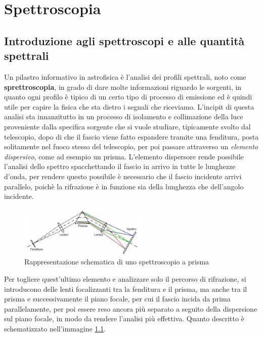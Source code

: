 \chapter{Spettroscopia}

\section{Introduzione agli spettroscopi e alle quantità spettrali}

Un pilastro informativo in astrofisica è l'analisi dei profili spettrali, noto come \textbf{sprettroscopia}, in grado di dare molte informazioni riguardo le sorgenti, in quanto ogni profilo è tipico di un certo tipo di processo di emissione ed è quindi utile per capire la fisica che sta dietro i segnali che riceviamo. L'incipit di questa analisi sta innanzitutto in un processo di isolamento e collimazione della luce proveniente dalla specifica sorgente che si vuole studiare, tipicamente svolto dal telescopio, dopo di che il fascio viene fatto espandere tramite una fenditura, posta solitamente nel fuoco stesso del telescopio, per poi passare attraverso un \textit{elemento dispersivo}, come ad esempio un prisma. L'elemento dispersore rende possibile l'analisi dello spettro spacchettando il fascio in arrivo in tutte le lunghezze d'onda, per rendere questo possibile è necessario che il fascio incidente arrivi parallelo, poichè la rifrazione è in funzione sia della lunghezza che dell'angolo incidente.

\begin{figure}[h]
    \centering
    \includegraphics[width=0.55\textwidth]{Immagini/Capitolo3/Spettrografo_schema.PNG}
    \caption{Rappresentazione schematica di uno spettroscopio a prisma}
    \label{im:schema-spettroscopio-prisma}
\end{figure}

Per togliere quest'ultimo elemento e analizzare solo il percorso di rifrazione, si introducono delle lenti focalizzanti tra la fenditura e il prisma, ma anche tra il prisma e successivamente il piano focale, per cui il fascio incida da prima parallelamente, per poi essere reso ancora più separato a seguito della dispersione sul piano focale, in modo da rendere l'analisi più effettiva. Quanto descritto è schematizzato nell'immagine \ref{im:schema-spettroscopio-prisma}.

